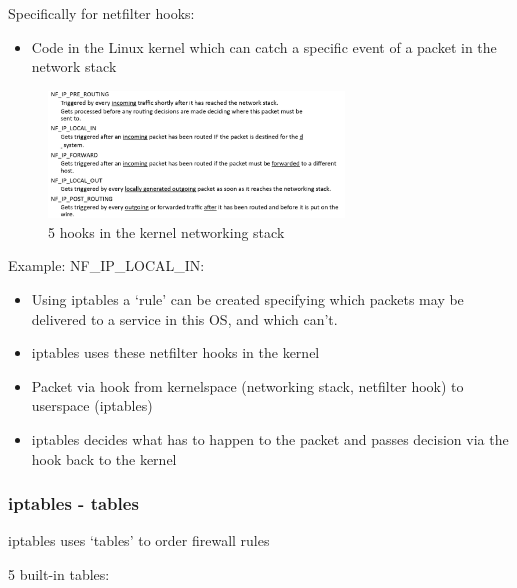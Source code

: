 \documentclass{article}
\begin{document}
Specifically for netfilter hooks:

\begin{itemize}
    \item Code in the Linux kernel which can catch a specific event of a packet in the network stack
\end{itemize}

\begin{figure}[H]
    \centering
    \includegraphics[width=0.7\textwidth]{hooks.png}
    \caption{5 hooks in the kernel networking stack}
\end{figure}

Example: NF\_IP\_LOCAL\_IN:

\begin{itemize}
    \item Using iptables a `rule' can be created specifying which packets may be delivered to a service in this OS, and which can't.
    \item iptables uses these netfilter hooks in the kernel
    \item Packet via hook from kernelspace (networking stack, netfilter hook) to userspace (iptables)
    \item iptables decides what has to happen to the packet and passes decision via the hook back to the kernel
\end{itemize}

\subsubsection{iptables - tables}

iptables uses `tables' to order firewall rules

5 built-in tables:
\end{document}
